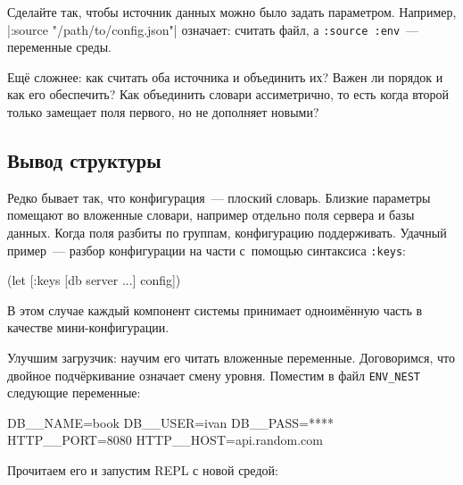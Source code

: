 Сделайте так, чтобы источник данных можно было задать параметром. Например,
\spverb|:source "/path/to/config.json"| означает: считать файл, а
\verb|:source :env|~--- переменные среды.


Ещё сложнее: как считать оба источника и объединить их? Важен ли порядок и как
его обеспечить? Как объединить словари ассиметрично, то есть когда второй только
замещает поля первого, но не дополняет новыми?

\subsection{Вывод структуры}


Редко бывает так, что конфигурация~--- плоский словарь. Близкие параметры
помещают во вложенные словари, например отдельно поля сервера и базы
данных. Когда поля разбиты по группам, конфигурацию поддерживать. Удачный
пример~--- разбор конфигурации на части с~помощью синтаксиса \verb|:keys|:

\begin{english}
  \begin{clojure}
(let [{:keys [db server ...]} config])
  \end{clojure}
\end{english}

\noindent
В этом случае каждый компонент системы принимает одноимённую часть в качестве
мини-конфигурации.

Улучшим загрузчик: научим его читать вложенные переменные. Договоримся, что
двойное подчёркивание означает смену уровня. Поместим в файл \verb|ENV_NEST|
следующие переменные:

\begin{english}
  \begin{bash}
DB__NAME=book
DB__USER=ivan
DB__PASS=****
HTTP__PORT=8080
HTTP__HOST=api.random.com
  \end{bash}
\end{english}


\noindent
Прочитаем его и запустим REPL с новой средой:

\begin{english}
\end{english}

